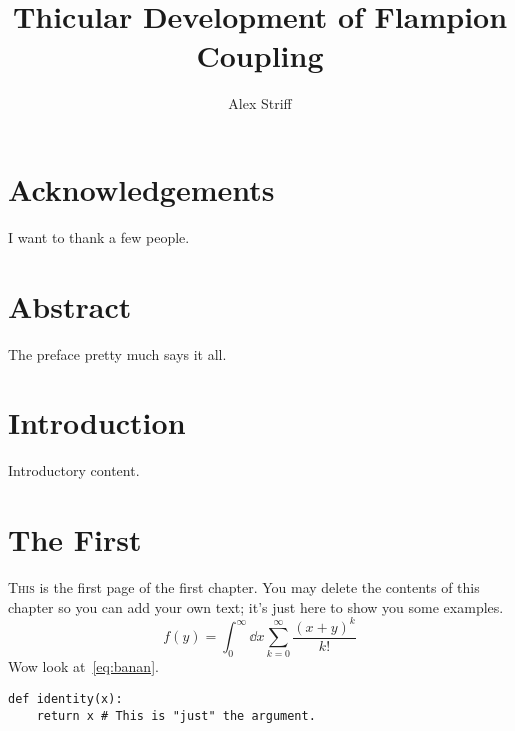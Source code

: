 \documentclass[12pt,draft]{reedthesis}
\title{\textbf{\large
  Thicular Development of Flampion Coupling
}\ifdraft{\\\textsc{Draft}}{}
}
\author{Alex Striff}
\date{\ifoptionfinal{May 2021}{\today}}
\theoremstyle{plain}
\theoremstyle{definition}
\begin{document}
\maketitle
\frontmatter
\pagestyle{empty}

\chapter*{Acknowledgements} %
I want to thank a few people.


\chapter*{Abstract}
The preface pretty much says it all.



\mainmatter%
\pagestyle{fancyplain}
\tableofcontents


\chapter*{Introduction}

Introductory content.

\chapter{The First}

\lettrine{T}{his} is the first page of the first chapter. You may delete the
contents of this chapter so you can add your own text; it's just here to show
you some examples.
\begin{equation}
  f(y)
  = \int_0^\infty \dd{x}\sum_{k=0}^\infty \frac{{(x + y)}^k}{k!}
  \label{eq:banan}
\end{equation}
Wow look at~\cref{eq:banan}.
\begin{verbatim}
def identity(x):
    return x # This is "just" the argument.
\end{verbatim}
\lipsum%
\end{document}
